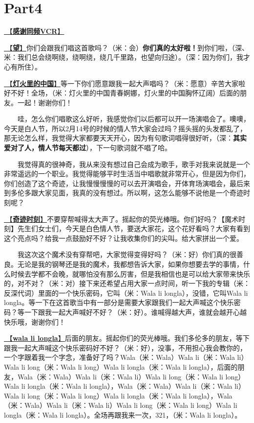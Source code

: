 \documentclass[]{ctexbook}
\begin{document}
\section{Part4}\label{Toronto-20250314-part4}

\hyperref[thank-you-vcr]{🎥【\textbf{感谢同频VCR}】}

\hyperref[hope]{🎵【\textbf{望}】}你们会跟我们唱这首歌吗？（米：会）\textbf{你们真的太好啦！}到你们啦，（深、米：我们总会绕啊绕，绕啊绕，绕几千里路，也望向归途）。（深：因为你们，我才心有所住）。

\hyperref[China-in-the-light]{🎵【\textbf{灯火里的中国}】}等一下你们愿意跟我一起大声唱吗？（米：愿意）辛苦大家啦好不好！全场，（米：灯火里的中国青春婀娜，灯火里的中国胸怀辽阔）后面的朋友。一起！谢谢你们！

  哇，怎么你们唱歌这么好听，我感觉你们以后都可以开一场演唱会了。噢噢，今天是白人节，所以2月14号的时候的情人节大家会过吗？摇头摇的头发都乱了，那无论怎么样，我觉得大家都要天天开心，因为有句歌词唱得很好听，（深：\textbf{其实爱对了人，情人节每天都过}），下一句歌词就不唱了哈。

  我觉得真的很神奇，我从来没有想过自己会成为歌手，歌手对我来说就是一个非常遥远的一个职业。我觉得能够平时生活当中唱歌就非常开心，但是因为你们，你们创造了这个奇迹，让我慢慢慢慢的可以去开演唱会，开体育场演唱会，最后来到多伦多跟大家见面，我真的没有想过。所以啊，这怎么能够不说他是一个奇迹时刻呢？

\hyperref[magic-moment]{🎵【\textbf{奇迹时刻}】}不要穿帮喊得太大声了。摇起你的荧光棒哦。你们好吗？【魔术时刻】先生们女士们，今天是白色情人节，要送大家花，这个花好看吗？大家有看到这个亮点吗？给我一点鼓励好不好？让我收集你们的尖叫。给大家拼出一个爱。

  我这次这个魔术没有穿帮吧，大家觉得变得好吗？（米：好）你们真的很善良。无论是我的钢琴还是我的魔术，我都想告诉大家，如果你想要去学的事情，什么时候去学都不会晚，就哪怕没有那么厉害，但是我相信也是可以给大家带来快乐的，对不对？（米：对）接下来还希望占用大家一点时间，听一下我的专辑（米：反深代词）里面的一个快乐密码，它叫（米：Wala li longla），没错，它叫Wala li longla。等一下在这首歌当中有一部分是需要大家跟我们一起大声喊这个快乐密码？等一下跟我一起大声喊好不好？（米：好）。谁喊得越大声，谁就会越开心越快乐哦，谢谢你们！

\hyperref[wala-li-longla]{🎵【\textbf{wala li longla}】}后面的朋友。摇起你们的荧光棒哦。我们多伦多的朋友，等下跟我一起大声喊这个快乐密码好不好？（米：好），没事，不用担心我会教你的，一个字跟着我一个字念，准备好了吗？Wala（米：Wala）Wala li（米：Wala li）Wala li long（米：Wala li long）Wala li longla（米：Wala li longla），后面的朋友，Wala（米：Wala）Wala li（米：Wala li）Wala li long（米：Wala li long）Wala li longla（米：Wala li longla），Wala（米：Wala）Wala li（米：Wala li）Wala li long（米：Wala li long）Wala li longla（米：Wala li longla），Wala（米：Wala）Wala li（米：Wala li）Wala li long（米：Wala li long）Wala li longla（米：Wala li longla）。全场再跟我来一次，321，（米：Wala li longla）。
\end{document}
